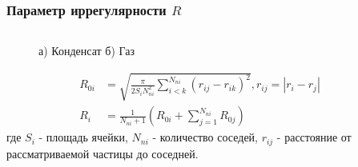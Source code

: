\documentclass[pdf,hyperref={unicode}]{beamer}
\begin{document}
\begin{frame}%
\transdissolve[duration=0.2]
\frametitle{Параметр иррегулярности $R$}

\begin{columns}

\begin{column}{0.47\linewidth}

\begin{figure}[h]
\caption{ \tiny а) Конденсат  \hspace{5mm}  б) Газ}
\end{figure}


\tiny{
\begin{equation}
\begin{aligned}
R_{0i} &= \sqrt{\frac{\pi}{2 S_i N_{ni}^2} \sum\limits_{i<k}^{N_{ni}} (r_{ij} - r_{ik})^2}, r_{ij} = |r_i - r_j| \\
R_i &= \frac{1}{N_{ni} + 1} \left( R_{0i} + \sum\limits_{j=1}^{N_{ni}} R_{0j} \right)
\end{aligned}
\label{eqR}
\end{equation}
}
\tiny{где $S_i$ - площадь ячейки, $N_{ni}$ - количество соседей, $r_{ij}$ - расстояние от рассматриваемой частицы до соседней.}


\end{column}
\begin{column}{0.47\linewidth}


\end{column}
\end{columns}
\end{frame}
\end{document}
